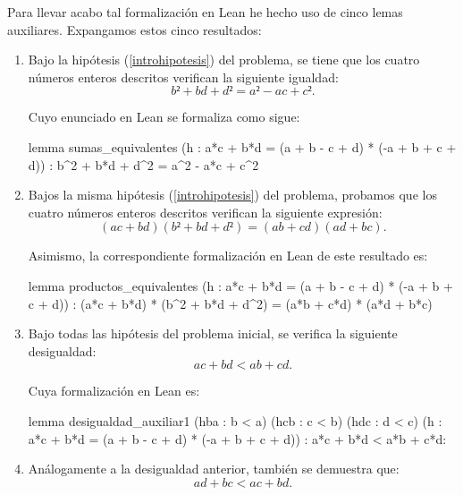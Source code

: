 Para llevar acabo tal formalización en Lean he hecho uso de cinco lemas
auxiliares. Expangamos estos cinco resultados:
\begin{enumerate}
\item Bajo la hipótesis (\ref{introhipotesis}) del problema, se tiene que los
  cuatro números enteros descritos verifican la siguiente igualdad:
  \begin{equation*}
    b²+bd+d²=a²-ac+c².
  \end{equation*}

  Cuyo enunciado en Lean se formaliza como sigue:
  \begin{leancode}
  lemma sumas_equivalentes
    (h : a*c + b*d = (a + b - c + d) * (-a + b + c + d))
    : b^2 + b*d + d^2 = a^2 - a*c + c^2
  \end{leancode}

\item Bajos la misma hipótesis (\ref{introhipotesis}) del problema, probamos
  que los cuatro números enteros descritos verifican la siguiente expresión:
  \begin{equation*}
    (ac+bd)(b²+bd+d²)=(ab+cd)(ad+bc).
  \end{equation*}

  Asimismo, la correspondiente formalización en Lean de este resultado es:
  \begin{leancode}
  lemma productos_equivalentes
    (h : a*c + b*d = (a + b - c + d) * (-a + b + c + d))
    : (a*c + b*d) * (b^2 + b*d + d^2) = (a*b + c*d) * (a*d + b*c)
  \end{leancode}

\item Bajo todas las hipótesis del problema inicial, se verifica la siguiente
  desigualdad:
  \begin{equation*}
    ac+bd<ab+cd.
  \end{equation*}

  Cuya formalización en Lean es:
  \begin{leancode}
  lemma desigualdad_auxiliar1
    (hba : b < a)
    (hcb : c < b)
    (hdc : d < c)
    (h : a*c + b*d = (a + b - c + d) * (-a + b + c + d))
    : a*c + b*d < a*b + c*d:
  \end{leancode}

\item Análogamente a la desigualdad anterior, también se demuestra que:
  \begin{equation*}
    ad+bc<ac+bd.
  \end{equation*}


\end{enumerate}
